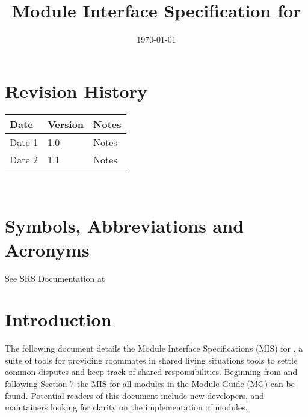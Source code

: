 \documentclass[12pt, titlepage]{article}
\begin{document}
\title{Module Interface Specification for \progname{}}

\author{\authname}

\date{\today}

\maketitle


\section{Revision History}

\begin{tabularx}{\textwidth}{p{3cm}p{2cm}X}
\toprule {\bf Date} & {\bf Version} & {\bf Notes}\\
\midrule
Date 1 & 1.0 & Notes\\
Date 2 & 1.1 & Notes\\
\bottomrule
\end{tabularx}

~\newpage

\section{Symbols, Abbreviations and Acronyms}

See SRS Documentation at 


\newpage

\tableofcontents

\newpage


\section{Introduction}

The following document details the Module Interface Specifications (MIS) for
\progname{}, a suite of tools for providing roommates in shared living situations tools to settle common disputes and keep track of shared responsibilities. Beginning from and following \hyperref[Start]{Section 7} the MIS for all modules in the \href{https://github.com/jinalkast/room8/tree/main/docs/Design/SoftArchitecture}{Module Guide} (MG) can be found. Potential readers of this document include new developers, and maintainers looking for clarity on the implementation of modules.\\
\end{document}
